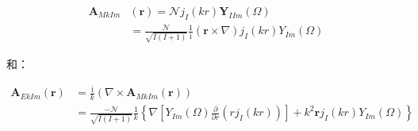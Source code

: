 \begin{align}
\boldsymbol{A}_{MkIm} & (\boldsymbol{r})=\mathcal{N}j_{I}(kr)\boldsymbol{Y}_{IIm}(\Omega)\nonumber \\
 & =\frac{\mathcal{N}}{\sqrt{I(I+1)}}\frac{1}{\mathrm{i}}(\boldsymbol{r}\times\nabla)j_{I}(kr)Y_{Im}(\Omega)
\end{align}

和：

\begin{align}
\boldsymbol{A}_{EkIm}(\boldsymbol{r}) & =\frac{\mathrm{i}}{k}(\nabla\times\boldsymbol{A}_{MkIm}(\boldsymbol{r}))\nonumber \\
 & =\frac{-\mathcal{N}}{\sqrt{I(I+1)}}\frac{1}{k}\left\{ \nabla\left[Y_{Im}(\Omega)\frac{\partial}{\partial r}(rj_{I}(kr))\right]+k^{2}\boldsymbol{r}j_{I}(kr)Y_{Im}(\Omega)\right\} 
\end{align}

